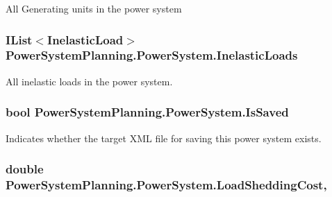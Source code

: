 All Generating units in the power system 

\subsubsection[{\texorpdfstring{Inelastic\+Loads}{InelasticLoads}}]{\setlength{\rightskip}{0pt plus 5cm}I\+List$<${\bf Inelastic\+Load}$>$ Power\+System\+Planning.\+Power\+System.\+Inelastic\+Loads\hspace{0.3cm}{\ttfamily [get]}}\hypertarget{class_power_system_planning_1_1_power_system_a3785895f5e1d62105769d59f433979b1}{}\label{class_power_system_planning_1_1_power_system_a3785895f5e1d62105769d59f433979b1}


All inelastic loads in the power system. 

\subsubsection[{\texorpdfstring{Is\+Saved}{IsSaved}}]{\setlength{\rightskip}{0pt plus 5cm}bool Power\+System\+Planning.\+Power\+System.\+Is\+Saved\hspace{0.3cm}{\ttfamily [get]}}\hypertarget{class_power_system_planning_1_1_power_system_a3c5e0bcb79c013e7ed5bdc2acda52d2d}{}\label{class_power_system_planning_1_1_power_system_a3c5e0bcb79c013e7ed5bdc2acda52d2d}


Indicates whether the target X\+ML file for saving this power system exists. 

\subsubsection[{\texorpdfstring{Load\+Shedding\+Cost}{LoadSheddingCost}}]{\setlength{\rightskip}{0pt plus 5cm}double Power\+System\+Planning.\+Power\+System.\+Load\+Shedding\+Cost\hspace{0.3cm}{\ttfamily [get]}, {\ttfamily [set]}}\hypertarget{class_power_system_planning_1_1_power_system_a3f0729d4eaa155e4b8be848d84a1fbff}{}\label{class_power_system_planning_1_1_power_system_a3f0729d4eaa155e4b8be848d84a1fbff}


